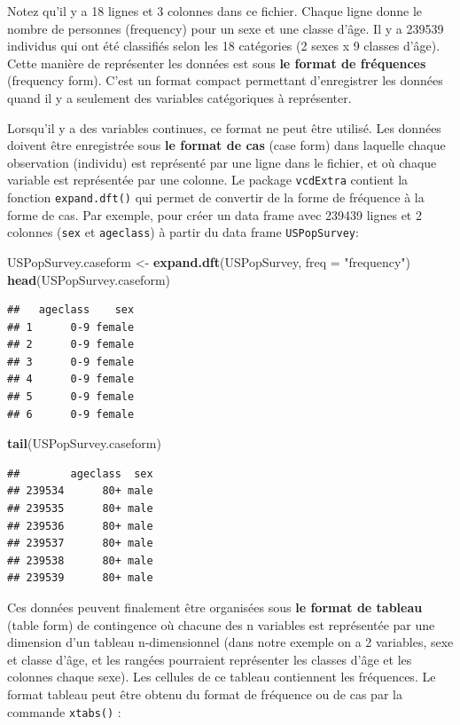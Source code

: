 \documentclass[
  12pt,
]{book}
\newenvironment{Shaded}{\begin{snugshade}}{\end{snugshade}}
\newcommand{\DataTypeTok}[1]{\textcolor[rgb]{0.13,0.29,0.53}{#1}}
\newcommand{\KeywordTok}[1]{\textcolor[rgb]{0.13,0.29,0.53}{\textbf{#1}}}
\newcommand{\NormalTok}[1]{#1}
\newcommand{\StringTok}[1]{\textcolor[rgb]{0.31,0.60,0.02}{#1}}
\begin{document}
Notez qu'il y a 18 lignes et 3 colonnes dans ce fichier. Chaque ligne donne le nombre de personnes (frequency) pour un sexe et une classe d'âge. Il y a 239539 individus qui ont été classifiés selon les 18 catégories (2 sexes x 9 classes d'âge). Cette manière de représenter les données est sous \textbf{le format de fréquences} (frequency form). C'est un format compact permettant d'enregistrer les données quand il y a seulement des variables catégoriques à représenter.

Lorsqu'il y a des variables continues, ce format ne peut être utilisé. Les données doivent être enregistrée sous \textbf{le format de cas} (case form) dans laquelle chaque observation (individu) est représenté par une ligne dans le fichier, et où chaque variable est représentée par une colonne. Le package \texttt{vcdExtra} contient la fonction \texttt{expand.dft()} qui permet de convertir de la forme de fréquence à la forme de cas. Par exemple, pour créer un data frame avec 239439 lignes et 2 colonnes (\texttt{sex} et \texttt{ageclass}) à partir du data frame \texttt{USPopSurvey}:

\begin{Shaded}
\begin{Highlighting}[]
\NormalTok{USPopSurvey.caseform \textless{}{-}}\StringTok{ }\KeywordTok{expand.dft}\NormalTok{(USPopSurvey, }\DataTypeTok{freq =} \StringTok{"frequency"}\NormalTok{)}
\KeywordTok{head}\NormalTok{(USPopSurvey.caseform)}
\end{Highlighting}
\end{Shaded}

\begin{verbatim}
##   ageclass    sex
## 1      0-9 female
## 2      0-9 female
## 3      0-9 female
## 4      0-9 female
## 5      0-9 female
## 6      0-9 female
\end{verbatim}

\begin{Shaded}
\begin{Highlighting}[]
\KeywordTok{tail}\NormalTok{(USPopSurvey.caseform)}
\end{Highlighting}
\end{Shaded}

\begin{verbatim}
##        ageclass  sex
## 239534      80+ male
## 239535      80+ male
## 239536      80+ male
## 239537      80+ male
## 239538      80+ male
## 239539      80+ male
\end{verbatim}

Ces données peuvent finalement être organisées sous \textbf{le format de tableau} (table form) de contingence où chacune des n variables est représentée par une dimension d'un tableau n-dimensionnel (dans notre exemple on a 2 variables, sexe et classe d'âge, et les rangées pourraient représenter les classes d'âge et les colonnes chaque sexe). Les cellules de ce tableau contiennent les fréquences. Le format tableau peut être obtenu du format de fréquence ou de cas par la commande \texttt{xtabs()} :
\end{document}
